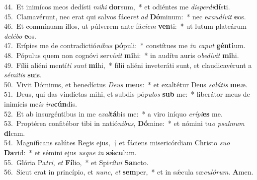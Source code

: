 {44.~}Et inimícos meos dedísti \textit{mi}\textit{hi} \textbf{dor}sum,~* et odiéntes me \textit{di}\textit{sper}\textit{di}\textbf{dí}sti.\\
{45.~}Clamavérunt, nec erat qui salvos fáce\textit{ret} \textit{ad} \textbf{Dó}minum:~* nec e\textit{xau}\textit{dí}\textit{vit} \textbf{e}os.\\
{46.~}Et commínuam illos, ut púlverem ante fá\textit{ci}\textit{em} \textbf{ven}ti:~* ut lutum plateárum \textit{de}\textit{lé}\textit{bo} \textbf{e}os.\\
{47.~}Erípies me de contradictió\textit{ni}\textit{bus} \textbf{pó}puli:~* constítues me \textit{in} \textit{ca}\textit{put} \textbf{gén}\textbf{ti}um.\\
{48.~}Pópulus quem non cognóvi ser\textit{ví}\textit{vit} \textbf{mi}hi:~* in audítu auris o\textit{be}\textit{dí}\textit{vit} \textbf{mi}hi.\\
{49.~}Fílii aliéni mentí\textit{ti} \textit{sunt} \textbf{mi}hi,~* fílii aliéni inveteráti sunt, et claudicavérunt a \textit{sé}\textit{mi}\textit{tis} \textbf{su}is.\\
{50.~}Vivit Dóminus, et benedíctus \textit{De}\textit{us} \textbf{me}us:~* et exaltétur Deus \textit{sa}\textit{lú}\textit{tis} \textbf{me}æ.\\
{51.~}Deus, qui das vindíctas mihi, et subdis pó\textit{pu}\textit{los} \textbf{sub} me:~* liberátor meus de inimícis me\textit{is} \textit{i}\textit{ra}\textbf{cún}dis.\\
{52.~}Et ab insurgéntibus in me \textit{e}\textit{xal}\textbf{tá}bis me:~* a viro iníquo \textit{e}\textit{rí}\textit{pi}\textbf{es} me.\\
{53.~}Proptérea confitébor tibi in natió\textit{ni}\textit{bus}, \textbf{Dó}mine:~* et nómini tu\textit{o} \textit{psal}\textit{mum} \textbf{di}cam.\\
{54.~}Magníficans salútes Regis ejus,~† et fáciens misericórdiam Christo \textit{su}\textit{o} \textbf{Da}vid:~* et sémini ejus \textit{us}\textit{que} \textit{in} \textbf{sǽ}\textbf{cu}lum.\\
{55.~}Glória Pa\textit{tri}, \textit{et} \textbf{Fí}lio,~* et Spi\textit{rí}\textit{tu}\textit{i} \textbf{San}cto.\\
{56.~}Sicut erat in princípio, et \textit{nunc}, \textit{et} \textbf{sem}per,~* et in sǽcula sæ\textit{cu}\textit{ló}\textit{rum}. \textbf{A}men.\\
